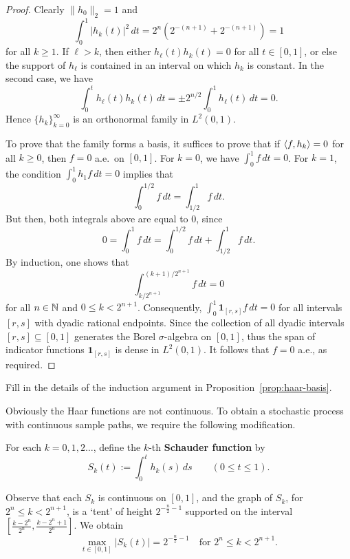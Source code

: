 \begin{proof}
Clearly $\|h_0\|_2 = 1$ and
\begin{equation*}
    \int_0^1 |h_k(t)|^2\,dt = 2^n(2^{-(n+1)}+2^{-(n+1)}) = 1
\end{equation*}
for all $k\ge 1$. If $\ell>k$, then either $h_\ell(t) h_k(t)=0$ for all $t\in [0,1]$, or else the support of $h_\ell$ is contained in an interval on which $h_k$ is constant. In the second case, we have
\begin{equation*}
    \int_0^t h_\ell(t)h_k(t)\,dt = \pm 2^{n/2}\int_0^1 h_\ell(t) \,dt = 0.
\end{equation*}
Hence $\{h_k\}_{k=0}^\infty$ is an orthonormal family in $L^2(0,1)$.

To prove that the family forms a basis, it suffices to prove that if $\braket{f,h_k}=0$ for all $k\ge 0$, then $f=0$ a.e.\ on $[0,1]$. For $k=0$, we have $\int_0^1 f\,dt = 0$. For $k=1$, the condition $\int_0^1 h_1 f\,dt = 0$ implies that
\begin{equation*}
    \int_0^{1/2}f\,dt = \int_{1/2}^1 f\,dt.
\end{equation*}
But then, both integrals above are equal to $0$, since
\begin{equation*}
    0 = \int_0^1 f\,dt = \int_0^{1/2}f\,dt + \int_{1/2}^1 f\,dt.
\end{equation*}
By induction, one shows that
\begin{equation*}
    \int_{k/2^{n+1}}^{(k+1)/2^{n+1}} f\,dt = 0
\end{equation*}
for all $n\in\mathbb{N}$ and $0\le k<2^{n+1}$. Consequently, $\int_0^1 \mathbf{1}_{[r,s]}f\,dt = 0$ for all intervals $[r,s]$ with dyadic rational endpoints. Since the collection of all dyadic intervals $[r,s]\subseteq [0,1]$ generates the Borel $\sigma$-algebra on $[0,1]$, thus the span of indicator functions $\mathbf{1}_{[r,s]}$ is dense in $L^2(0,1)$. It follows that $f=0$ a.e., as required.
\end{proof}

\begin{exercise}
    Fill in the details of the induction argument in Proposition~\ref{prop:haar-basis}.
\end{exercise}

Obviously the Haar functions are not continuous. To obtain a stochastic process with continuous sample paths, we require the following modification.
\begin{definition}
    For each $k=0,1,2\ldots$, define the $k$-th \textbf{Schauder function} by
    \begin{equation}
        S_k(t) := \int_0^t h_k(s)\,ds \qquad (0\le t\le 1).
    \end{equation}
\end{definition}
Observe that each $S_k$ is continuous on $[0,1]$, and the graph of $S_k$, for $2^n\le k<2^{n+1}$, is a `tent' of height $2^{-\frac{n}{2}-1}$ supported on the interval $[\tfrac{k-2^n}{2^n}, \tfrac{k-2^n+1}{2^n}]$. We obtain
\begin{equation}
\label{eq:Sk-max}
    \max_{t\in [0,1]}|S_k(t)| = 2^{-\frac{n}{2}-1} \quad\text{for }2^n\le k<2^{n+1}.
\end{equation}

